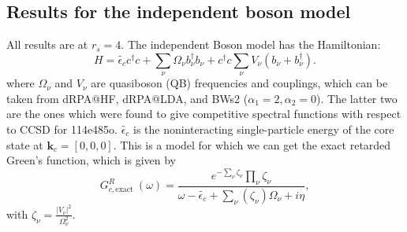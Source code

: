 \subsection{Results for the independent boson model}
All results are at $r_s = 4$. The independent Boson model has the Hamiltonian:
\begin{equation}
H=\tilde{\epsilon_c} c^{\dagger} c+\sum_\nu \Omega_{\nu} b_\nu^{\dagger} b_\nu+c^{\dagger} c \sum_\nu V_\nu\left(b_\nu+b_\nu^{\dagger}\right) .
\end{equation}
where $\Omega_\nu$ and $V_\nu$ are quasiboson (QB) frequencies and couplings, which can be taken from dRPA@HF, dRPA@LDA, and BWs2 ($\alpha_1=2, \alpha_2=0$). The latter two are the ones which were found to give competitive spectral functions with respect to CCSD for 114e485o. $\tilde{\epsilon_c}$ is the noninteracting single-particle energy of the core state at $\mathbf{k}_c=[0,0,0]$. This is a model for which we can get the exact retarded Green's function, which is given by
\begin{equation}
    G^R_{c,\text {exact }}(\omega)= \frac{e^{-\sum_\nu \zeta_{\nu}} \prod_\nu \zeta_{\nu}}{\omega-\tilde{\epsilon_c}+\sum_\nu (\zeta_{\nu})\Omega_{\nu}+i \eta}, 
\label{eq:exact_g}
\end{equation}
with  $\zeta_{\nu} = \frac{|V_\nu|^2}{\Omega_{\nu}^2}$.
